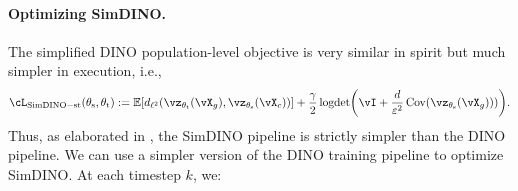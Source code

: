 \documentclass[\toplevelprefix/book-main.tex]{subfiles}
\begin{document}
\paragraph{Optimizing SimDINO.} The simplified DINO population-level objective is very similar in spirit but much simpler in execution, i.e.,
\begin{equation}\label{eq:simdino_loss_teacherstudent}
    \cL_{\simdino-\student\teacher}(\theta_{\student}, \theta_{\teacher}) :=  \Ex\rs{d_{\ell^{2}}(\vz_{\theta_{\teacher}}(\vX_{g}), \vz_{\theta_{\student}}(\vX_{c}))} + \frac{\gamma}{2}\logdet\rp{\vI + \frac{d}{\eps^{2}}\Cov(\vz_{\theta_{\student}}(\vX_{g})))}.
\end{equation}
Thus, as elaborated in , the SimDINO pipeline is strictly simpler than the DINO pipeline. We can use a simpler version of the DINO training pipeline to optimize SimDINO. At each timestep \(k\), we:
\end{document}

